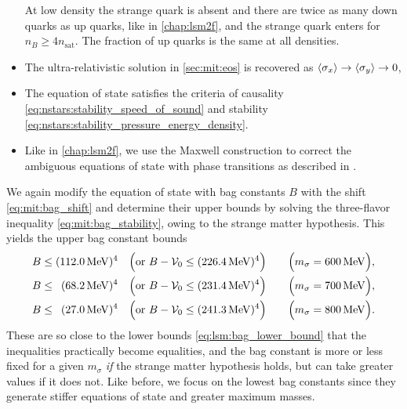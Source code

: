 \begin{itemize}
      At low density the strange quark is absent and there are twice as many down quarks as up quarks,
      like in \cref{chap:lsm2f},
      and the strange quark enters for $n_B \geq 4 n_\text{sat}$.
      The fraction of up quarks is the same at all densities.
\item The ultra-relativistic solution in \cref{sec:mit:eos} is recovered
      as $\langle \sigma_x \rangle \rightarrow \langle \sigma_y \rangle \rightarrow 0$, 
\item The equation of state satisfies the criteria of causality \eqref{eq:nstars:stability_speed_of_sound}
      and stability \eqref{eq:nstars:stability_pressure_energy_density}.
\item Like in \cref{chap:lsm2f}, we use the Maxwell construction to correct the ambiguous equations of state with phase transitions as described in \cite[equation (4.69)]{ref:master_francesco}.
\end{itemize}

We again modify the equation of state with bag constants $B$ with the shift \eqref{eq:mit:bag_shift}
and determine their upper bounds by solving the three-flavor inequality \eqref{eq:mit:bag_stability}, owing to the strange matter hypothesis.
This yields the upper bag constant bounds
\begin{subequations}
\begin{align}
	B \leq (\SI{112.0}{\mega\electronvolt})^4           \quad \Big(\text{or } B-\mathcal{V}_0 \leq (\SI{226.4}{\mega\electronvolt})^4\Big) \qquad \Big(m_\sigma = \SI{600}{\mega\electronvolt}\Big), \label{eq:lsm3f:bag_upper_bound_600} \\
	B \leq \phantom{0}(\SI{68.2}{\mega\electronvolt})^4 \quad \Big(\text{or } B-\mathcal{V}_0 \leq (\SI{231.4}{\mega\electronvolt})^4\Big) \qquad \Big(m_\sigma = \SI{700}{\mega\electronvolt}\Big), \label{eq:lsm3f:bag_upper_bound_700} \\
	B \leq \phantom{0}(\SI{27.0}{\mega\electronvolt})^4 \quad \Big(\text{or } B-\mathcal{V}_0 \leq (\SI{241.3}{\mega\electronvolt})^4\Big) \qquad \Big(m_\sigma = \SI{800}{\mega\electronvolt}\Big). \label{eq:lsm3f:bag_upper_bound_800}
\end{align}%
\label{eq:lsm3f:bag_upper_bound}%
\end{subequations}%
These are so close to the lower bounds \eqref{eq:lsm:bag_lower_bound} that the inequalities practically become equalities,
and the bag constant is more or less fixed for a given $m_\sigma$ \emph{if} the strange matter hypothesis holds, but can take greater values if it does not.
Like before, we focus on the lowest bag constants since they generate stiffer equations of state and greater maximum masses.

